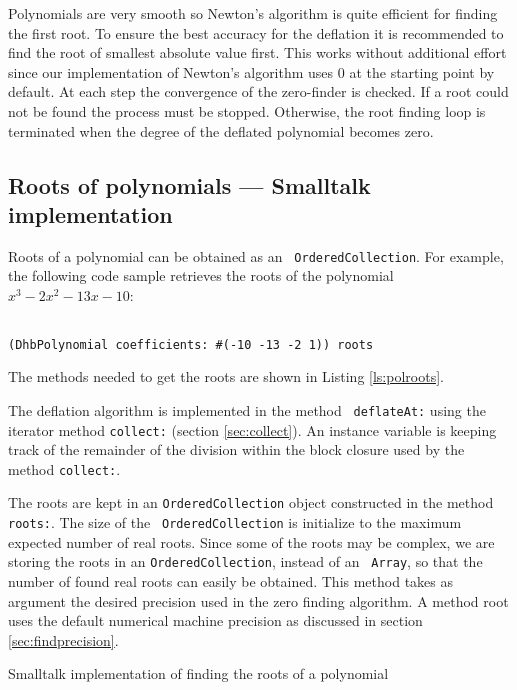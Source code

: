 \documentclass[twoside]{book}
\begin{document}
Polynomials are very smooth so Newton's algorithm is quite
efficient for finding the first root. To ensure the best accuracy
for the deflation it is recommended to find the root of smallest
absolute value first. This works without additional effort since
our implementation of Newton's algorithm uses 0 at the starting
point by default. At each step the convergence of the zero-finder
is checked. If a root could not be found the process must be
stopped. Otherwise, the root finding loop is terminated when the
degree of the deflated polynomial becomes zero.

\subsection{Roots of polynomials --- Smalltalk implementation}
Roots of a polynomial can be obtained as an {\tt
OrderedCollection}. For example, the following code sample
retrieves the roots of the polynomial $x^3-2x^2-13x-10$:
\begin{codeExample}
\begin{verbatim}

\end{verbatim}
{\tt (DhbPolynomial coefficients: \#(-10 -13 -2 1)) roots}
\end{codeExample}
The methods needed to get the roots are shown in Listing
\ref{ls:polroots}.

The deflation algorithm is implemented in the method {\tt
deflateAt:} using the iterator method {\tt collect:} (\cf section
\ref{sec:collect}). An instance variable is keeping track of the
remainder of the division within the block closure used by the
method {\tt collect:}.

The roots are kept in an {\tt OrderedCollection} object
constructed in the method {\tt roots:}. The size of the {\tt
OrderedCollection} is initialize to the maximum expected number of
real roots. Since some of the roots may be complex, we are storing
the roots in an {\tt OrderedCollection}, instead of an {\tt
Array}, so that the number of found real roots can easily be
obtained. This method takes as argument the desired precision used
in the zero finding algorithm. A method root uses the default
numerical machine precision as discussed in section
\ref{sec:findprecision}.

\begin{listing} Smalltalk implementation of finding the roots of a polynomial \label{ls:polroots}

\end{listing}
\end{document}
